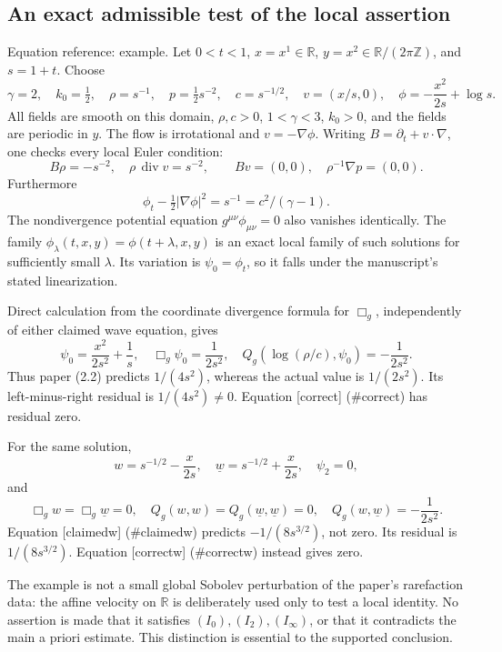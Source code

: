 \documentclass[10pt]{article}
\begin{document}
\subsection*{An exact admissible test of the local assertion}
Equation reference: example. Let \(0<t<1\), \(x=x^1\in\mathbb R\), \(y=x^2\in\mathbb R/(2\pi\mathbb Z)\), and \(s=1+t\). Choose \[
\gamma=2,\quad k_0=\tfrac12,\quad
\rho=s^{-1},\quad p=\tfrac12s^{-2},\quad c=s^{-1/2},\quad
v=(x/s,0),\quad \phi=-\frac{x^2}{2s}+\log s .\] All fields are smooth on this domain, \(\rho,c>0\), \(1<\gamma<3\), \(k_0>0\), and the fields are periodic in \(y\). The flow is irrotational and \(v=-\nabla\phi\). Writing \(B=\partial_t+v\cdot\nabla\), one checks every local Euler condition: \[B\rho=-s^{-2},\quad \rho\,\operatorname{div}v=s^{-2},\qquad
Bv=(0,0),\quad \rho^{-1}\nabla p=(0,0).\] Furthermore \[\phi_t-\tfrac12|\nabla\phi|^2=s^{-1}=c^2/(\gamma-1).\] The nondivergence potential equation \(g^{\mu\nu}\phi_{\mu\nu}=0\) also vanishes identically. The family \(\phi_\lambda(t,x,y)=\phi(t+\lambda,x,y)\) is an exact local family of such solutions for sufficiently small \(\lambda\). Its variation is \(\psi_0=\phi_t\), so it falls under the manuscript’s stated linearization.\par
Direct calculation from the coordinate divergence formula for \(\Box_g\), independently of either claimed wave equation, gives \[\psi_0=\frac{x^2}{2s^2}+\frac1s,\quad
\Box_g\psi_0=\frac1{2s^2},\quad
Q_g(\log(\rho/c),\psi_0)=-\frac1{2s^2}.\] Thus paper (2.2) predicts \(1/(4s^2)\), whereas the actual value is \(1/(2s^2)\). Its left-minus-right residual is \(1/(4s^2)\ne0\). Equation [correct] (\#correct) has residual zero.\par
For the same solution, \[w=s^{-1/2}-\frac{x}{2s},\quad
\underline{w}=s^{-1/2}+\frac{x}{2s},\quad \psi_2=0,\] and \[\Box_gw=\Box_g\underline{w}=0,\quad
Q_g(w,w)=Q_g(\underline{w},\underline{w})=0,\quad
Q_g(w,\underline{w})=-\frac1{2s^2}.\] Equation [claimedw] (\#claimedw) predicts \(-1/(8s^{3/2})\), not zero. Its residual is \(1/(8s^{3/2})\). Equation [correctw] (\#correctw) instead gives zero.\par
The example is not a small global Sobolev perturbation of the paper’s rarefaction data: the affine velocity on \(\mathbb R\) is deliberately used only to test a local identity. No assertion is made that it satisfies \((I_0),(I_2),(I_\infty)\), or that it contradicts the main a priori estimate. This distinction is essential to the supported conclusion.\par
\end{document}
